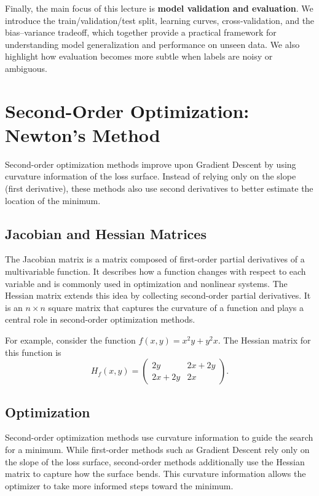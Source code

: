 \documentclass{article}
\begin{document}
Finally, the main focus of this lecture is \textbf{model validation and evaluation}. We introduce the train/validation/test split, learning curves, cross-validation, and the bias--variance tradeoff, which together provide a practical framework for understanding model generalization and performance on unseen data. We also highlight how evaluation becomes more subtle when labels are noisy or ambiguous.



\section{Second-Order Optimization: Newton's Method}

Second-order optimization methods improve upon Gradient Descent by using curvature information of the loss surface. Instead of relying only on the slope (first derivative), these methods also use second derivatives to better estimate the location of the minimum.

\subsection{Jacobian and Hessian Matrices}

The Jacobian matrix is a matrix composed of first-order partial derivatives of a multivariable function. It describes how a function changes with respect to each variable and is commonly used in optimization and nonlinear systems. The Hessian matrix extends this idea by collecting second-order partial derivatives. It is an \( n \times n \) square matrix that captures the curvature of a function and plays a central role in second-order optimization methods.

For example, consider the function \( f(x,y) = x^2y + y^2x \). The Hessian matrix for this function is
\[
H_f(x,y)=
\begin{pmatrix}
2y & 2x+2y\\
2x+2y & 2x
\end{pmatrix}.
\]

\subsection{Optimization}

Second-order optimization methods use curvature information to guide the search for a minimum. While first-order methods such as Gradient Descent rely only on the slope of the loss surface, second-order methods additionally use the Hessian matrix to capture how the surface bends. This curvature information allows the optimizer to take more informed steps toward the minimum.
\end{document}
